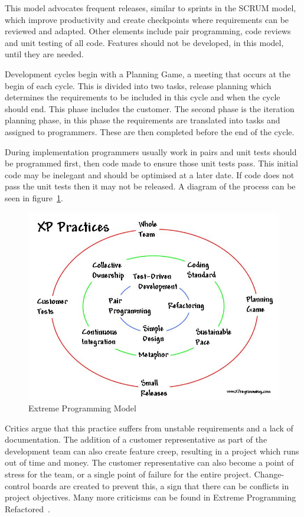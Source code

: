 \documentclass[11pt,a4paper]{article}
\begin{document}
This model advocates frequent releases, similar to sprints in the SCRUM model, which improve productivity and create checkpoints where requirements can be reviewed and adapted. Other elements include pair programming, code reviews and unit testing of all code. Features should not be developed, in this model, until they are needed.

Development cycles begin with a Planning Game, a meeting that occurs at the begin of each cycle. This is divided into two tasks, release planning which determines the requirements to be included in this cycle and when the cycle should end. This phase includes the customer. The second phase is the iteration planning phase, in this phase the requirements are translated into tasks and assigned to programmers. These are then completed before the end of the cycle.

During implementation programmers usually work in pairs and unit tests should be programmed first, then code made to ensure those unit tests pass. This initial code may be inelegant and should be optimised at a later date. If code does not pass the unit tests
then it may not be released. A diagram of the process can be seen in figure~\ref{fig:xp}.

\begin{figure}[H]
\centering
\includegraphics[width = 140mm]{circles.jpg}
\caption{Extreme Programming Model~\cite{xpCircles}}
\label{fig:xp}
\end{figure}

Critics argue that this practice suffers from unstable requirements and a lack of documentation. The addition of a customer representative as part of the development team can also create feature creep, resulting in a project which runs out of time and
money. The customer representative can also become a point of stress for the team, or a single point of failure for the entire project. Change-control boards are created to prevent this, a sign that there can be conflicts in project objectives. Many more criticisms can be found in Extreme Programming Refactored~\cite{xpRefactored}.
\end{document}

